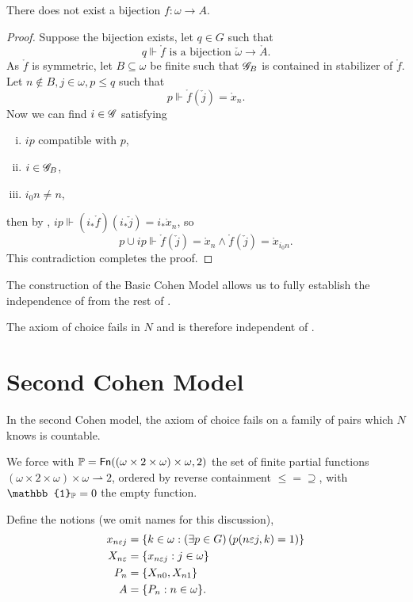 \begin{lemma}
    There does not exist a bijection \(f:\omega\to A\).
\end{lemma}
\begin{proof}
Suppose the bijection exists, let \(q \in G\) such that \[q\Vdash \mathring{f} \text{ is a bijection } \check{\omega}\to\mathring{A}. \]
As \(\mathring{f}\) is symmetric, let \(B\subseteq \omega\) be finite such that \(\mathscr{G}_B\) is contained in stabilizer of \(\mathring{f}\).
Let \(n\notin B, j\in\omega, p\leq q\) such that \[p\Vdash \mathring{f}(\check{j}) = \mathring{x}_n.\]
Now we can find \(i\in\mathscr{G}\) satisfying
\begin{enumerate}[i.]
    \item \(i p\) compatible with \(p\),
    \item \(i \in \mathscr{G}_B\),
    \item \(i_0 n\ne n\),
\end{enumerate}
then by , \(i p \Vdash (i_* \mathring{f})(i_* \check{j}) = i_* \mathring{x}_{n}\), so
\[p \cup i p \Vdash \mathring{f}(\check{j}) = \mathring{x}_n \land \mathring{f}(\check{j}) = \mathring{x}_{i_0 n}. \]
This contradiction completes the proof.
\end{proof}

The construction of the Basic Cohen Model allows us to fully establish the independence of  from the rest of \ZF.
\begin{theorem}
    The axiom of choice fails in \(N\) and is therefore independent of \ZF.
\end{theorem}




\section{Second Cohen Model}

In the second Cohen model, the axiom of choice fails on a family of pairs which \(N\) knows is countable.


We force with \(\mathbb{P} = \operatorname{\mathsf{Fn}}((\omega\times 2 \times\omega)\times\omega, 2)\)
the set of finite partial functions \((\omega\times 2 \times\omega)\times\omega \rightharpoonup 2\),
ordered by reverse containment \(\leq = \supseteq\),
with \(\mathbb{1}_\P = 0\) the empty function.

Define the notions (we omit names for this discussion),
\begin{align*}
    x_{n\varepsilon j} &= {\left\{ k\in\omega: \left(\exists p\in G\right) \left(p(n\varepsilon j, k) = 1\right)  \right\}}\\
    X_{n\varepsilon} &= {\left\{ x_{n\varepsilon j}: j\in\omega \right\}}\\
    P_n &= {\left\{ X_{n0}, X_{n1} \right\}}\\
    A &= {\left\{ P_n:n\in\omega \right\}}.
\end{align*}

